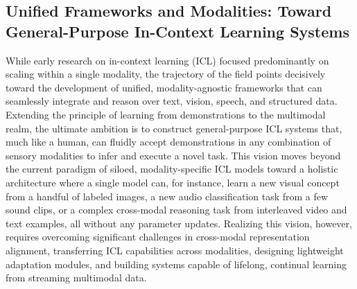 \documentclass[11pt]{article}
\begin{document}
\subsection{Unified Frameworks and Modalities: Toward General-Purpose In-Context Learning Systems}

While early research on in-context learning (ICL) focused predominantly on scaling within a single modality, the trajectory of the field points decisively toward the development of unified, modality-agnostic frameworks that can seamlessly integrate and reason over text, vision, speech, and structured data. Extending the principle of learning from demonstrations to the multimodal realm, the ultimate ambition is to construct general-purpose ICL systems that, much like a human, can fluidly accept demonstrations in any combination of sensory modalities to infer and execute a novel task. This vision moves beyond the current paradigm of siloed, modality-specific ICL models toward a holistic architecture where a single model can, for instance, learn a new visual concept from a handful of labeled images, a new audio classification task from a few sound clips, or a complex cross-modal reasoning task from interleaved video and text examples, all without any parameter updates. Realizing this vision, however, requires overcoming significant challenges in cross-modal representation alignment, transferring ICL capabilities across modalities, designing lightweight adaptation modules, and building systems capable of lifelong, continual learning from streaming multimodal data.
\end{document}
